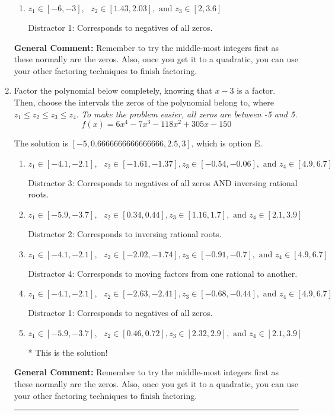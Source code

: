 \documentclass{extbook}[14pt]
\newcommand{\litem}[1]{\item #1

\rule{\textwidth}{0.4pt}}
\begin{document}
\begin{enumerate}
{\begin{enumerate}[label=\Alph*.]
 Distractor 4: Corresponds to moving factors from one rational to another.
\item \( z_1 \in [-6, -3], \text{   }  z_2 \in [1.43, 2.03], \text{   and   } z_3 \in [2, 3.6] \)

 Distractor 1: Corresponds to negatives of all zeros.
\end{enumerate}

\textbf{General Comment:} Remember to try the middle-most integers first as these normally are the zeros. Also, once you get it to a quadratic, you can use your other factoring techniques to finish factoring.
}
\litem{
Factor the polynomial below completely, knowing that $x-3$ is a factor. Then, choose the intervals the zeros of the polynomial belong to, where $z_1 \leq z_2 \leq z_3 \leq z_4$. \textit{To make the problem easier, all zeros are between -5 and 5.}
\[ f(x) = 6x^{4} -7 x^{3} -118 x^{2} +305 x -150 \]

The solution is \( [-5, 0.6666666666666666, 2.5, 3] \), which is option E.\begin{enumerate}[label=\Alph*.]
\item \( z_1 \in [-4.1, -2.1], \text{   }  z_2 \in [-1.61, -1.37], z_3 \in [-0.54, -0.06], \text{   and   } z_4 \in [4.9, 6.7] \)

 Distractor 3: Corresponds to negatives of all zeros AND inversing rational roots.
\item \( z_1 \in [-5.9, -3.7], \text{   }  z_2 \in [0.34, 0.44], z_3 \in [1.16, 1.7], \text{   and   } z_4 \in [2.1, 3.9] \)

 Distractor 2: Corresponds to inversing rational roots.
\item \( z_1 \in [-4.1, -2.1], \text{   }  z_2 \in [-2.02, -1.74], z_3 \in [-0.91, -0.7], \text{   and   } z_4 \in [4.9, 6.7] \)

 Distractor 4: Corresponds to moving factors from one rational to another.
\item \( z_1 \in [-4.1, -2.1], \text{   }  z_2 \in [-2.63, -2.41], z_3 \in [-0.68, -0.44], \text{   and   } z_4 \in [4.9, 6.7] \)

 Distractor 1: Corresponds to negatives of all zeros.
\item \( z_1 \in [-5.9, -3.7], \text{   }  z_2 \in [0.46, 0.72], z_3 \in [2.32, 2.9], \text{   and   } z_4 \in [2.1, 3.9] \)

* This is the solution!
\end{enumerate}

\textbf{General Comment:} Remember to try the middle-most integers first as these normally are the zeros. Also, once you get it to a quadratic, you can use your other factoring techniques to finish factoring.
}
\end{enumerate}
\end{document}
